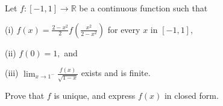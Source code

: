 Let $f:[-1,1]\to\mathbb{R}$ be a continuous function such that

(i) $f(x)=\frac{2-x^2}{2}f\left(\frac{x^2}{2-x^2}\right)$ for every $x$ in $[-1,1],$

(ii) $ f(0)=1,$ and

(iii) $\lim_{x\to 1^-}\frac{f(x)}{\sqrt{1-x}}$ exists and is finite.

Prove that $f$ is unique, and express $f(x)$ in closed form.